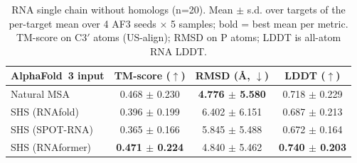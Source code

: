 \begin{table}[htbp]
\centering
\caption{RNA single chain without homologs (n=20). Mean $\pm$ s.d. over targets of the per-target mean over 4 AF3 seeds $\times$ 5 samples; bold = best mean per metric. TM-score on C3$'$ atoms (US-align); RMSD on P atoms; LDDT is all-atom RNA LDDT.}
\label{tab:rna_single_chain_without_homologs}
\begin{tabular}{lccc}
\toprule
AlphaFold~3 input & TM-score ($\uparrow$) & RMSD (\AA, $\downarrow$) & LDDT ($\uparrow$) \\
\midrule
Natural MSA & 0.468 $\pm$ 0.230 & \textbf{4.776 $\pm$ 5.580} & 0.718 $\pm$ 0.229 \\
SHS (RNAfold) & 0.396 $\pm$ 0.199 & 6.402 $\pm$ 6.151 & 0.687 $\pm$ 0.213 \\
SHS (SPOT-RNA) & 0.365 $\pm$ 0.166 & 5.845 $\pm$ 5.488 & 0.672 $\pm$ 0.164 \\
SHS (RNAformer) & \textbf{0.471 $\pm$ 0.224} & 4.840 $\pm$ 5.462 & \textbf{0.740 $\pm$ 0.203} \\
\bottomrule
\end{tabular}
\end{table}
